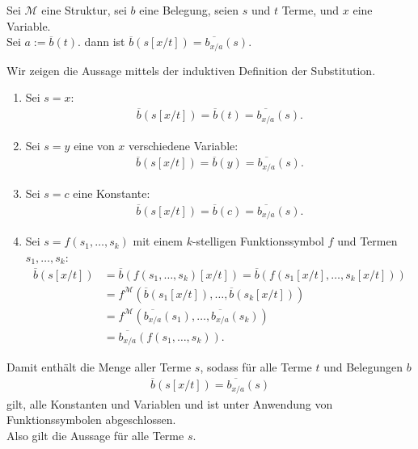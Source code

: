 
\begin{exercise}[66]

Sei $\mathscr{M}$ eine Struktur, sei $b$ eine Belegung, seien $s$ und $t$ Terme,
und $x$ eine Variable. \\
Sei $a := \overline{b}(t)$. dann ist $\overline{b}(s[x/t])
= \overline{b_{x/a}}(s)$.

\end{exercise}


\begin{solution}

Wir zeigen die Aussage mittels der induktiven Definition der Substitution.
\begin{enumerate}
  \item Sei $s = x$:
  \begin{align*}
    \overline{b}(s[x/t]) = \overline{b}(t) = \overline{b_{x/a}}(s).
  \end{align*}
  \item Sei $s = y$ eine von $x$ verschiedene Variable:
  \begin{align*}
    \overline{b}(s[x/t]) = \overline{b}(y) = \overline{b_{x/a}}(s).
  \end{align*}
  \item Sei $s = c$ eine Konstante:
  \begin{align*}
    \overline{b}(s[x/t]) = \overline{b}(c) = \overline{b_{x/a}}(s).
  \end{align*}
  \item Sei $s = f(s_1,\dots,s_k)$ mit einem $k$-stelligen Funktionssymbol $f$
  und Termen $s_1,\dots,s_k$:
  \begin{align*}
    \overline{b}(s[x/t]) &= \overline{b}(f(s_1,\dots,s_k)[x/t])
    = \overline{b}(f(s_1[x/t],\dots,s_k[x/t])) \\
    &= f^{\mathscr{M}}(\overline{b}(s_1[x/t]),\dots,\overline{b}(s_k[x/t])) \\
    &= f^{\mathscr{M}}(\overline{b_{x/a}}(s_1),\dots,\overline{b_{x/a}}(s_k)) \\
    &= \overline{b_{x/a}}(f(s_1,\dots,s_k)).
  \end{align*}
\end{enumerate}
Damit enthält die Menge aller Terme $s$, sodass für alle Terme $t$ und Belegungen $b$
\begin{align*}
  \overline{b}(s[x/t]) = \overline{b_{x/a}}(s)
\end{align*}
gilt, alle Konstanten und Variablen und ist unter Anwendung von Funktionssymbolen
abgeschlossen. \\
Also gilt die Aussage für alle Terme $s$.
\end{solution}

